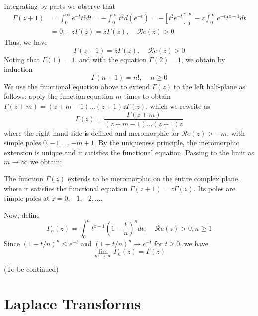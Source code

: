 \documentclass[12pt, a4paper, oneside, openright, titlepage]{book}
\begin{document}
Integrating by parts we observe that \begin{align*}
    \Gamma(z+1) &= \int_0^{\infty}e^{-t}t^zdt = -\int_0^{\infty}t^2d(e^{-t}) = -[t^2e^{-t}]_0^{\infty} + z\int_0^{\infty}e^{-t}t^{z-1}dt \\
    &= 0 + z\Gamma(z)  = z\Gamma(z),\;\;\;\;\mathscr{R}e(z) > 0
\end{align*}
Thus, we have \begin{equation*}
    \boxed{\Gamma(z+1) = z\Gamma(z),\;\;\;\;\mathscr{R}e(z) > 0}
\end{equation*}
Noting that $\Gamma(1) = 1$, and with the equation $\Gamma(2) = 1$, we obtain by induction \begin{equation*}
    \boxed{\Gamma(n+1) = n!,\;\;\;\;n\geq 0}
\end{equation*}
We use the functional equation above to extend $\Gamma(z)$ to the left half-plane as follows: apply the function equation $m$ times to obtain $\Gamma(z+m)=(z+m-1)...(z+1)z\Gamma(z)$, which we rewrite as \begin{equation*}
    \boxed{\Gamma(z) = \frac{\Gamma(z+m)}{(z+m-1)...(z+1)z}}
\end{equation*}
where the right hand side is defined and meromorphic for $\mathscr{R}e(z) > -m$, with simple poles $0,-1,...,-m+1$. By the uniqueness principle, the meromorphic extension is unique and it satisfies the functional equation. Passing to the limit as $m\rightarrow \infty$ we obtain:

\begin{thm}
    The function $\Gamma(z)$ extends to be meromorphic on the entire complex plane, where it satisfies the functional equation $\Gamma(z+1)=z\Gamma(z)$. Its poles are simple poles at $z = 0,-1,-2,...$.
\end{thm}

Now, define \begin{equation*}
    \Gamma_n(z) = \int_0^nt^{z-1}\left(1-\frac{t}{n}\right)^ndt,\;\;\;\;\mathscr{R}e(z) > 0, n\geq 1
\end{equation*}
Since $(1-t/n)^n \leq e^{-t}$ and $(1-t/n)^n \rightarrow e^{-t}$ for $t \geq 0$, we have \begin{equation*}
    \lim\limits_{m\rightarrow \infty}\Gamma_n(z) = \Gamma(z)
\end{equation*}

(To be continued)



\section{Laplace Transforms}
\end{document}
